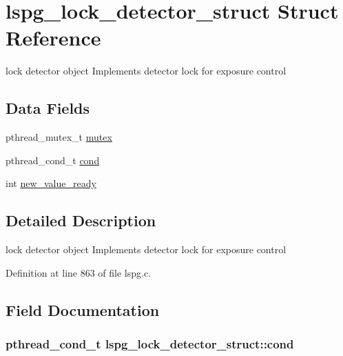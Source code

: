 \hypertarget{structlspg__lock__detector__struct}{\section{lspg\-\_\-lock\-\_\-detector\-\_\-struct Struct Reference}
\label{structlspg__lock__detector__struct}
}


lock detector object Implements detector lock for exposure control  


\subsection*{Data Fields}
\begin{DoxyCompactItemize}
\item 
pthread\-\_\-mutex\-\_\-t \hyperlink{structlspg__lock__detector__struct_ab5ab5534b376a8fbafdd0b54cec4483c}{mutex}
\item 
pthread\-\_\-cond\-\_\-t \hyperlink{structlspg__lock__detector__struct_adc90c859665dccc8717219e824cba0b8}{cond}
\item 
int \hyperlink{structlspg__lock__detector__struct_a62373414b815fe178edd8522b3bd4d78}{new\-\_\-value\-\_\-ready}
\end{DoxyCompactItemize}


\subsection{Detailed Description}
lock detector object Implements detector lock for exposure control 

Definition at line 863 of file lspg.\-c.



\subsection{Field Documentation}
\hypertarget{structlspg__lock__detector__struct_adc90c859665dccc8717219e824cba0b8}{
\subsubsection[{cond}]{\setlength{\rightskip}{0pt plus 5cm}pthread\-\_\-cond\-\_\-t lspg\-\_\-lock\-\_\-detector\-\_\-struct\-::cond}}\label{structlspg__lock__detector__struct_adc90c859665dccc8717219e824cba0b8}


